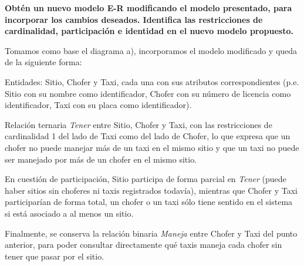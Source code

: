 \item \textbf{Obtén un nuevo modelo E-R modificando el modelo presentado, para incorporar los cambios deseados. Identifica las restricciones de cardinalidad, participación e identidad en el nuevo modelo propuesto.}

Tomamos como base el diagrama a), incorporamos el modelo modificado y queda de la siguiente forma:
 
Entidades: Sitio, Chofer y Taxi, cada una con sus atributos correspondientes (p.e. Sitio con su nombre como identificador, Chofer con su número de licencia como identificador, Taxi con su placa como identificador).
 
Relación ternaria \textit{Tener} entre Sitio, Chofer y Taxi, con las restricciones de cardinalidad 1 del lado de Taxi como del lado de Chofer, lo que expresa que un chofer no puede manejar más de un taxi en el mismo sitio y que un taxi no puede ser manejado por más de un chofer en el mismo sitio.
 
En cuestión de participación, Sitio participa de forma parcial en \textit{Tener} (puede haber sitios sin choferes ni taxis registrados todavía), mientras que Chofer y Taxi participarían de forma total, un chofer o un taxi sólo tiene sentido en el sistema si está asociado a al menos un sitio.
 
Finalmente, se conserva la relación binaria \textit{Maneja} entre Chofer y Taxi del punto anterior, para poder consultar directamente qué taxis maneja cada chofer sin tener que pasar por el sitio.
 
